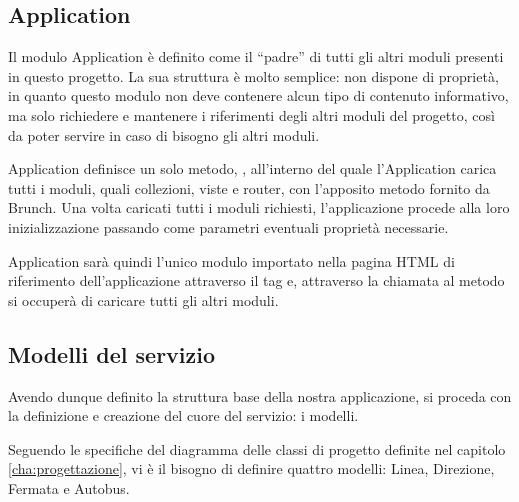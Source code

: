 \subsection{Application} %
\label{sub:application}

Il modulo Application è definito come il ``padre'' di tutti gli altri moduli presenti in questo progetto.
La sua struttura è molto semplice: non dispone di proprietà, in quanto questo modulo non deve contenere alcun tipo di contenuto informativo, ma solo richiedere e mantenere i riferimenti degli altri moduli del progetto, così da poter servire in caso di bisogno gli altri moduli.

Application definisce un solo metodo, , all'interno del quale l'Application carica tutti i moduli, quali collezioni, viste e router, con l'apposito metodo fornito da Brunch. Una volta caricati tutti i moduli richiesti, l'applicazione procede alla loro inizializzazione passando come parametri eventuali proprietà necessarie. 

Application sarà quindi l'unico modulo importato nella pagina HTML di riferimento dell'applicazione attraverso il tag  e, attraverso la chiamata al metodo  si occuperà di caricare tutti gli altri moduli.

\subsection{Modelli del servizio} %
\label{sub:modelli_del_servizio}

Avendo dunque definito la struttura base della nostra applicazione, si proceda con la definizione e creazione del cuore del servizio: i modelli.

Seguendo le specifiche del diagramma delle classi di progetto definite nel capitolo \ref{cha:progettazione}, vi è il bisogno di definire quattro modelli: Linea, Direzione, Fermata e Autobus.

